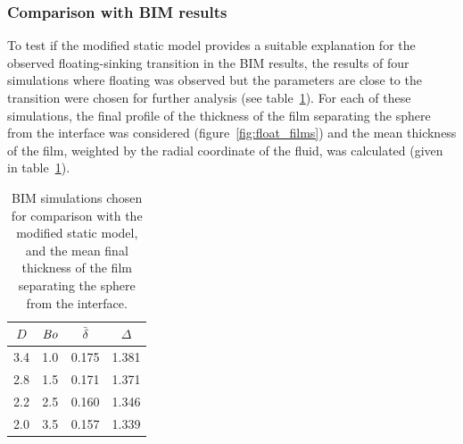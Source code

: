 \documentclass[12pt]{article}
\newcommand\Bo{\mbox{\textit{Bo}}}  %
\begin{document}
\subsubsection{Comparison with BIM results}
\label{subsubsection:mod_comp_bim}

To test if the modified static model provides a suitable explanation for the observed floating-sinking transition in the BIM results, the results of four simulations where floating was observed but the parameters are close to the transition were chosen for further analysis (see table~\ref{tab:film_sims}). For each of these simulations, the final profile of the thickness of the film separating the sphere from the interface was considered (figure~\ref{fig:float_films}) and the mean thickness of the film, weighted by the radial coordinate of the fluid, was calculated (given in table~\ref{tab:film_sims}).

\begin{longtable}{|c|c|c|c|}
  \caption{BIM simulations chosen for comparison with the modified static model, and the mean final thickness of the film separating the sphere from the interface. \label{tab:film_sims}} \\ %
  \hline
$D$ & $\Bo$ & $\bar{\delta}$ & $\Delta$ \\
  \hline %
  3.4 & 1.0 & 0.175 & 1.381 \\
  2.8 & 1.5 & 0.171 & 1.371 \\
  2.2 & 2.5 & 0.160 & 1.346 \\
  2.0 & 3.5 & 0.157 & 1.339 \\
  \hline
\end{longtable}
\end{document}
